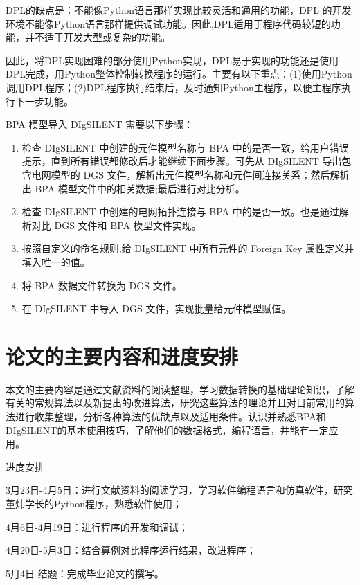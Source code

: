 DPL的缺点是：不能像Python语言那样实现比较灵活和通用的功能，DPL 的开发环境不能像Python语言那样提供调试功能。因此,DPL适用于程序代码较短的功能，并不适于开发大型或复杂的功能。

因此，将DPL实现困难的部分使用Python实现，DPL易于实现的功能还是使用DPL完成，用Python整体控制转换程序的运行。主要有以下重点：(1)使用Python调用DPL程序；(2)DPL程序执行结束后，及时通知Python主程序，以便主程序执行下一步功能。

BPA 模型导入 DIgSILENT 需要以下步骤：
  \begin{enumerate}[1)]
  \item 检查 DIgSILENT 中创建的元件模型名称与 BPA 中的是否一致，给用户错误提示，直到所有错误都修改后才能继续下面步骤。可先从 DIgSILENT 导出包含电网模型的 DGS 文件，解析出元件模型名称和元件间连接关系；然后解析出 BPA 模型文件中的相关数据;最后进行对比分析。
  \item 检查 DIgSILENT 中创建的电网拓扑连接与 BPA 中的是否一致。也是通过解析对比 DGS 文件和 BPA 模型文件实现。
  \item 按照自定义的命名规则,给 DIgSILENT 中所有元件的 Foreign Key 属性定义并填入唯一的值。
  \item 将 BPA 数据文件转换为 DGS 文件。
  \item 在 DIgSILENT 中导入 DGS 文件，实现批量给元件模型赋值。
  \end{enumerate}

\section{论文的主要内容和进度安排}

本文的主要内容是通过文献资料的阅读整理，学习数据转换的基础理论知识，了解有关的常规算法以及新提出的改进算法，研究这些算法的理论并且对目前常用的算法进行收集整理，分析各种算法的优缺点以及适用条件。认识并熟悉BPA和DIgSILENT的基本使用技巧，了解他们的数据格式，编程语言，并能有一定应用。

进度安排

3月23日-4月5日：进行文献资料的阅读学习，学习软件编程语言和仿真软件，研究董炜学长的Python程序，熟悉软件使用；

4月6日-4月19日：进行程序的开发和调试；

4月20日-5月3日：结合算例对比程序运行结果，改进程序；

5月4日-结题：完成毕业论文的撰写。


